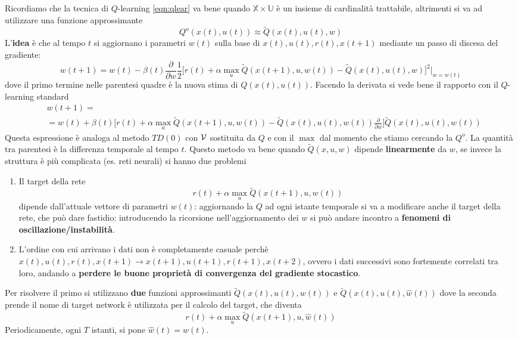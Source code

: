 Ricordiamo che la tecnica di $Q$-learning \ref{eqn:qlear} va bene quando $\mathbb{X} \times \mathbb{U}$ \`e un insieme di cardinalit\`a trattabile, altrimenti si va ad utilizzare una funzione approssimante
\begin{equation}
Q^o(x(t),u(t)) \approx \tilde{Q}(x(t),u(t),w)
\end{equation} L'\textbf{idea} \`e che al tempo $t$ si aggiornano i parametri $w(t)$ sulla base di $x(t),u(t),r(t),x(t+1)$ mediante un passo di discesa del gradiente:
\begin{equation}
w(t+1) = w(t) - \beta(t) \frac{\partial}{\partial w} \frac{1}{2} \Big [ r(t) + \alpha \max_u \tilde{Q} (x(t+1),u,w(t)) - \tilde{Q}(x(t),u(t),w) \Big]^2 \Big |_{w=w(t)}
\end{equation} dove il primo termine nelle parentesi quadre \`e la nuova stima di $Q(x(t),u(t))$. Facendo la derivata si vede bene il rapporto con il $Q$-learning standard
\begin{align*}
&w(t+1) = \\
&=w(t) + \beta(t) \Big [ r(t)+\alpha \max_u \tilde{Q}(x(t+1),u,w(t)) - \tilde{Q}(x(t),u(t),w(t)) \frac{\partial}{\partial w}\Big ]\tilde{Q}(x(t),u(t),w(t))
\end{align*}
Questa espressione \`e analoga al metodo $TD(0)$ con $\mathcal{V}$ sostituita da $Q$ e con il $\max$ dal momento che stiamo cercando la $Q^o$. La quantit\`a tra parentesi \`e la differenza temporale al tempo $t$.
Questo metodo va bene quando $\tilde{Q}(x,u,w)$ dipende \textbf{linearmente} da $w$, se invece la struttura \`e pi\`u complicata (es. reti neurali) si hanno due problemi
\begin{enumerate}
\item Il target della rete
    \begin{equation} r(t) + \alpha \max_u \tilde{Q} (x(t+1), u, w(t))\end{equation}
    dipende dall'attuale vettore di parametri $w(t)$: aggiornando la $Q$ ad ogni istante temporale si va a modificare anche il target della rete, che pu\`o dare fastidio: introducendo la ricorsione nell'aggiornamento dei $w$ si pu\`o andare incontro a \textbf{fenomeni di oscillazione/instabilit\`a}.
\item L'ordine con cui arrivano i dati non \`e completamente casuale perch\`e $x(t), u(t),r(t),x(t+1) \to x(t+1), u(t+1), r(t+1), x(t+2)$, ovvero i dati successivi sono fortemente correlati tra loro, andando a \textbf{perdere le buone propriet\`a di convergenza del gradiente stocastico}.
\end{enumerate}
Per risolvere il primo si utilizzano \textbf{due} funzioni approssimanti $\tilde{Q}(x(t),u(t),w(t))$ e $\tilde{Q}(x(t),u(t),\hat{w}(t))$ dove la seconda prende il nome di target network \`e utilizzata per il calcolo del target, che diventa
\begin{equation}
r(t) + \alpha \max_u \tilde{Q}(x(t+1), u, \hat{w}(t))
\end{equation} Periodicamente, ogni $T$ istanti, si pone $\hat{w}(t) = w(t)$.

